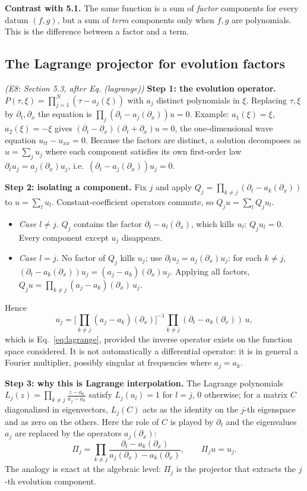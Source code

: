 \documentclass[11pt]{article}
\theoremstyle{plain}
\theoremstyle{definition}
\theoremstyle{remark}
\begin{document}
\medskip\textbf{Contrast with 5.1.} The same function is a sum of \emph{factor} components for every datum $(f,g)$, but a sum of \emph{term} components only when $f,g$ are polynomials. This is the difference between a factor and a term.

\subsection{The Lagrange projector for evolution factors}\label{expl:E8}
\noindent\emph{(E8: Section 5.3, after Eq. (lagrange))}
\textbf{Step 1: the evolution operator.} $P(\tau,\xi)=\prod_{j=1}^N(\tau-a_j(\xi))$ with $a_j$ distinct polynomials in $\xi$. Replacing $\tau,\xi$ by $\partial_t,\partial_x$ the equation is $\prod_j(\partial_t-a_j(\partial_x))u=0$. Example: $a_1(\xi)=\xi$, $a_2(\xi)=-\xi$ gives $(\partial_t-\partial_x)(\partial_t+\partial_x)u=0$, the one-dimensional wave equation $u_{tt}-u_{xx}=0$. Because the factors are distinct, a solution decomposes as $u=\sum_ju_j$ where each component satisfies its own first-order law $\partial_tu_j=a_j(\partial_x)u_j$, i.e.\ $(\partial_t-a_j(\partial_x))u_j=0$.

\medskip\textbf{Step 2: isolating a component.} Fix $j$ and apply $Q_j=\prod_{k\ne j}(\partial_t-a_k(\partial_x))$ to $u=\sum_lu_l$. Constant-coefficient operators commute, so $Q_ju=\sum_lQ_ju_l$.
\begin{itemize}[nosep]
\item \emph{Case $l\ne j$.} $Q_j$ contains the factor $\partial_t-a_l(\partial_x)$, which kills $u_l$: $Q_ju_l=0$. Every component except $u_j$ disappears.
\item \emph{Case $l=j$.} No factor of $Q_j$ kills $u_j$; use $\partial_tu_j=a_j(\partial_x)u_j$: for each $k\ne j$, $(\partial_t-a_k(\partial_x))u_j=(a_j-a_k)(\partial_x)u_j$. Applying all factors, $Q_ju=\prod_{k\ne j}(a_j-a_k)(\partial_x)\,u_j$.
\end{itemize}
Hence
\[
u_j=\Big[\prod_{k\ne j}(a_j-a_k)(\partial_x)\Big]^{-1}\prod_{k\ne j}(\partial_t-a_k(\partial_x))\,u,
\]
which is Eq.~\eqref{eq:lagrange}, provided the inverse operator exists on the function space considered. It is not automatically a differential operator: it is in general a Fourier multiplier, possibly singular at frequencies where $a_j=a_k$.

\medskip\textbf{Step 3: why this is Lagrange interpolation.} The Lagrange polynomials $L_j(z)=\prod_{k\ne j}\frac{z-a_k}{a_j-a_k}$ satisfy $L_j(a_l)=1$ for $l=j$, $0$ otherwise; for a matrix $C$ diagonalized in eigenvectors, $L_j(C)$ acts as the identity on the $j$-th eigenspace and as zero on the others. Here the role of $C$ is played by $\partial_t$ and the eigenvalues $a_j$ are replaced by the operators $a_j(\partial_x)$:
\[
\Pi_j=\prod_{k\ne j}\frac{\partial_t-a_k(\partial_x)}{a_j(\partial_x)-a_k(\partial_x)},\qquad \Pi_ju=u_j .
\]
The analogy is exact at the algebraic level: $\Pi_j$ is the projector that extracts the $j$-th evolution component.
\end{document}
